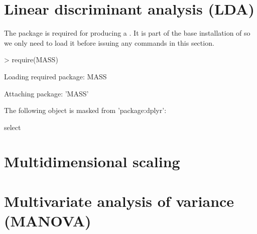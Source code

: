 \section{Linear discriminant analysis (LDA)} 
 
The  package is required for producing a . It is part of the base installation of \R{} so we only need to load it before issuing any commands in this section. 
\begin{Schunk}
\begin{Sinput}
> require(MASS) 
\end{Sinput}
\begin{Soutput}
Loading required package: MASS
\end{Soutput}
\begin{Soutput}

Attaching package: 'MASS'
\end{Soutput}
\begin{Soutput}
The following object is masked from 'package:dplyr':

    select
\end{Soutput}
\end{Schunk}
 
\section{Multidimensional scaling} 
 
\section{Multivariate analysis of variance (MANOVA)} 
 
 
\section{} 
 
 
\section{} 
 
 
\section{} 
 
 
\section{} 
 
 
\section{} 
 
 
\section{} 
 
 
 

